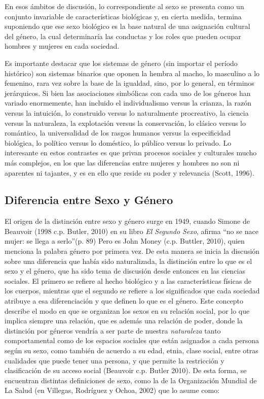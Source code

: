 En esos ámbitos de discusión, lo correspondiente al sexo se presenta como un
conjunto invariable de características biológicas y, en cierta medida, termina
suponiendo que ese sexo biológico es la base natural de una asignación cultural
del género, la cual determinaría las conductas y los roles que pueden ocupar
hombres y mujeres en cada sociedad.

Es importante destacar que los sistemas de género (sin importar el período
histórico) son sistemas binarios que oponen la hembra al macho, lo masculino a
lo femenino, rara vez sobre la base de la igualdad, sino, por lo general, en
términos jerárquicos.
Si bien las asociaciones simbólicas con cada uno de los géneros han variado
enormemente, han incluido el individualismo versus la crianza, la razón versus
la intuición, lo construido versus lo naturalmente procreativo, la ciencia
versus la naturaleza, la explotación versus la conservación, lo clásico versus
lo romántico, la universalidad de los rasgos humanos versus la especificidad
biológica, lo político versus lo doméstico, lo público versus lo privado.
Lo interesante en estos contrastes es que privan procesos sociales y culturales
mucho más complejos, en los que las diferencias entre mujeres y hombres no son
ni aparentes ni tajantes, y es en ello que reside su poder y relevancia (Scott,
1996).

\subsection{Diferencia entre Sexo y Género}
El origen de la distinción entre sexo y género surge en 1949, cuando Simone de
Beauvoir (1998 c.p. Butler, 2010) en su libro \emph{El Segundo Sexo}, afirma “no
se nace mujer: se llega a serlo”(p. 89)
Pero es John Money (c.p. Buttler, 2010), quien menciona la palabra género por
primera vez.
De esta manera se inicia la discusión sobre una diferencia que había sido
naturalizada, la distinción entre lo que es el sexo y el género, que ha sido
tema de discusión desde entonces en las ciencias sociales.
El primero se refiere al hecho biológico y a las características físicas de los
cuerpos, mientras que el segundo se refiere a los significados que cada sociedad
atribuye a esa diferenciación y que definen lo que es el género.
Este concepto describe el modo en que se organizan los sexos en su relación
social, por lo que implica siempre una relación, que es además una relación de
poder, donde la distinción por géneros vendría a ser parte de nuestra
\emph{naturaleza} tanto comportamental como de los espacios sociales que están
asignados a cada persona según su sexo, como también de acuerdo a su edad,
etnia, clase social, entre otras cualidades que puede tener una persona, y que
permite la restricción y clasificación de su acceso social (Beauvoir c.p. Butler
2010).
De esta forma, se encuentran distintas definiciones de sexo, como la de la
Organización Mundial de La Salud (en Villegas, Rodríguez y Ochoa, 2002) que lo
asume como:

